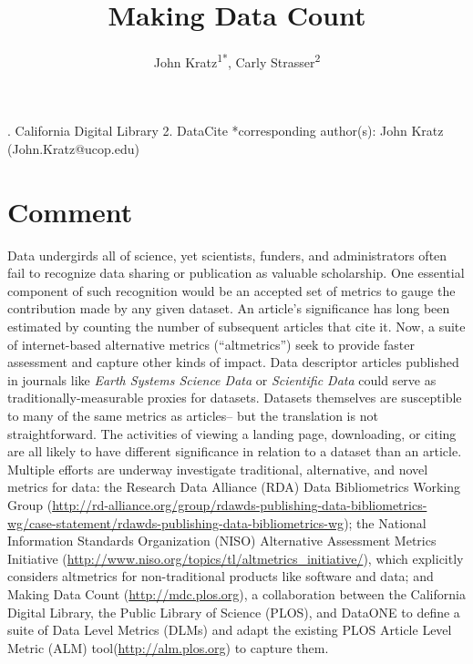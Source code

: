 \documentclass[english]{article}
\begin{document}
\title{Making Data Count}


\author{John Kratz\textsuperscript{1{*}}, Carly Strasser\textsuperscript{2}}

. California Digital Library 2. DataCite 
{*}corresponding author(s): John Kratz (John.Kratz@ucop.edu)


\section*{Comment}


Data undergirds all of science, yet scientists, funders, and administrators often fail to recognize data sharing or publication as valuable scholarship.
One essential component of such recognition would be an accepted set of metrics to gauge the contribution made by any given dataset.
An article's significance has long been estimated by counting the number of subsequent articles that cite it. 
Now, a suite of internet-based alternative metrics (``altmetrics'') seek to provide faster assessment and capture other kinds of impact\cite{priem_altmetrics_2012}.
Data descriptor articles published in journals like \textit{Earth Systems Science Data} or \textit{Scientific Data} could serve as traditionally-measurable proxies for datasets\cite{@pfeiffenberger_earth_2008, @editors_more_2014}.
Datasets themselves are susceptible to many of the same metrics as articles-- but the translation is not straightforward.
The activities of viewing a landing page, downloading, or citing are all likely to have different significance in relation to a dataset than an article.
Multiple efforts are underway investigate traditional, alternative, and novel metrics for data: the Research Data Alliance (RDA) Data Bibliometrics Working Group (\url{http://rd-alliance.org/group/rdawds-publishing-data-bibliometrics-wg/case-statement/rdawds-publishing-data-bibliometrics-wg}{}); the National Information Standards Organization (NISO) Alternative Assessment Metrics Initiative (\url{http://www.niso.org/topics/tl/altmetrics_initiative/}), which explicitly considers altmetrics for non-traditional products like software and data; and Making Data Count (\url{http://mdc.plos.org}), a collaboration between the California Digital Library, the Public Library of Science (PLOS), and DataONE to define a suite of Data Level Metrics (DLMs) and adapt the existing PLOS Article Level Metric (ALM) tool(\url{http://alm.plos.org}) to capture them.
\end{document}
